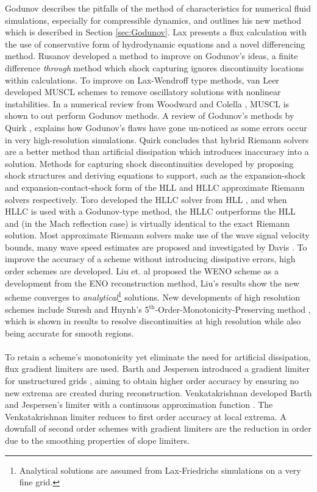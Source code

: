 	Godunov \cite{Godunov59} describes the pitfalls of the method of characteristics for numerical fluid simulations, especially for compressible dynamics, and outlines his new method which is described in Section \ref{sec:Godunov}. Lax presents a flux calculation \cite{Lax54} with the use of conservative form of hydrodynamic equations and a novel differencing method. Rusanov \cite{Rusanov61} developed a method to improve on Godunov's ideas, a finite difference \emph{through} method which shock capturing ignores discontinuity locations within calculations. To improve on Lax-Wendroff type methods, van Leer \cite{vanLeer79} developed MUSCL schemes to remove oscillatory solutions with nonlinear instabilities. In a numerical review from Woodward and Colella \cite{Woodward84}, MUSCL is shown to out perform Godunov methods. A review of Godunov's methods by Quirk \cite{Quirk94}, explains how Godunov's flaws have gone un-noticed as some errors occur in very high-resolution simulations. Quirk concludes that hybrid Riemann solvers are a better method than artificial dissipation which introduces inaccuracy into a solution. Methods for capturing shock discontinuities developed by proposing shock structures and deriving equations to support, such as the expansion-shock and expansion-contact-shock form of the HLL and HLLC approximate Riemann solvers respectively. Toro developed the HLLC solver from HLL \cite{Toro92}, and when HLLC is used with a Godunov-type method, the HLLC outperforms the HLL and (in the Mach reflection case) is virtually identical to the exact Riemann solution. Most approximate Riemann solvers make use of the wave signal velocity bounds, many wave speed estimates are proposed and investigated by Davis \cite{Davis88}. To improve the accuracy of a scheme without introducing dissipative errors, high order schemes are developed. Liu et. al \cite{Liu94} proposed the WENO scheme as a development from the ENO reconstruction method, Liu's results show the new scheme converges to \emph{analytical}\footnote{Analytical solutions are assumed from Lax-Friedrichs simulations on a very fine grid.} solutions. New developments of high resolution schemes include Suresh and Huynh's 5$^{\mathrm{th}}$-Order-Monotonicity-Preserving method \cite{Suresh97}, which is shown in results to resolve discontinuities at high resolution while also being accurate for smooth regions.
	\\ \\
	To retain a scheme's monotonicity yet eliminate the need for artificial dissipation, flux gradient limiters are used. Barth and Jespersen introduced a gradient limiter for unstructured grids \cite{Barth89}, aiming to obtain higher order accuracy by ensuring no new extrema are created during reconstruction. Venkatakrishnan developed Barth and Jespersen's limiter with a continuous approximation function \cite{Venkatakrishnan93}. The Venkatakrishnan limiter reduces to first order accuracy at local extrema. A downfall of second order schemes with gradient limiters are the reduction in order due to the smoothing properties of slope limiters. 
